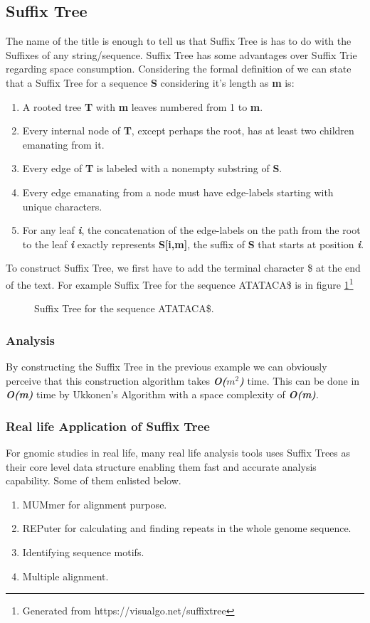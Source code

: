 \documentclass{standalone}
\begin{document}
\subsection{Suffix Tree}
The name of the title is enough to tell us that Suffix Tree is has to do with the Suffixes of any string/sequence. Suffix Tree has some advantages over Suffix Trie regarding space consumption. Considering the formal definition of we can state that a Suffix Tree for a sequence {\bf{S}} considering it's length as {\bf {m}} is:
\begin{enumerate}
	\item A rooted tree {\bf {T}} with {\bf {m}} leaves numbered from 1 to {\bf {m}}.
	\item Every internal node of {\bf {T}}, except perhaps the root, has at least two children emanating from it. 
	\item Every edge of {\bf {T}} is labeled with a nonempty substring of {\bf {S}}.
	\item Every edge emanating from a node must have edge-labels starting with unique characters.
	\item For any leaf {\bf \emph{i}}, the concatenation of the edge-labels on the path from the root to the leaf {\bf \emph{i}} exactly represents {\bf {S[i,m]}}, the suffix of {\bf{S}} that starts at position {\bf \emph{i}}.
\end{enumerate}
To construct Suffix Tree, we first have to add the terminal character \$ at the end of the text.
For example Suffix Tree for the sequence ATATACA\$ is in figure \ref{fig:ST}\footnote{Generated from https://visualgo.net/suffixtree}
\begin{figure}[ht]
	\centering
	\caption{Suffix Tree for the sequence ATATACA\$.}
	\label{fig:ST}
\end{figure} 

\subsubsection{Analysis}
By constructing the Suffix Tree in the previous example we can obviously perceive that this construction algorithm takes {\bf \emph{O($m^2$)}} time. This can be done in {\bf \emph{O(m)}} time by Ukkonen's Algorithm\cite{STUKO} with a space complexity of {\bf \emph{O(m)}}.
\subsubsection{Real life Application of Suffix Tree}
For gnomic studies in real life, many real life analysis tools uses Suffix Trees as their core level data structure enabling them fast and accurate analysis capability. Some of them enlisted below.
\begin{enumerate}
	\item MUMmer for alignment purpose. \cite{MUMmer1, MUMmer2, MUMmer3}
	\item REPuter for calculating and finding repeats in the whole genome sequence. \cite{REPuter}
	\item Identifying sequence motifs.\cite{MOTIF1, MOTIF2}
	\item Multiple alignment.\cite{MALIGN}
\end{enumerate}
\end{document}
